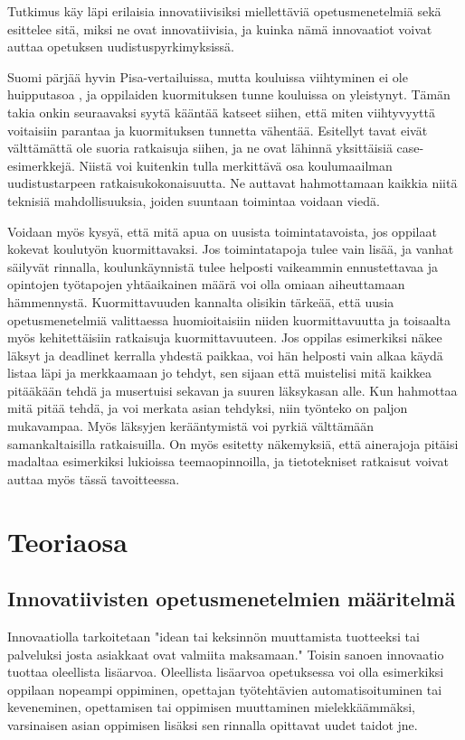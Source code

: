\documentclass[utf8,bachelor]{gradu3}
\begin{document}
Tutkimus käy läpi erilaisia innovatiivisiksi miellettäviä opetusmenetelmiä sekä esittelee sitä, miksi ne ovat innovatiivisia, ja kuinka nämä innovaatiot voivat auttaa opetuksen uudistuspyrkimyksissä. %

Suomi pärjää hyvin Pisa-vertailuissa, mutta kouluissa viihtyminen ei ole huipputasoa \parencite[][]{kouluViihtyvyys}, ja oppilaiden kuormituksen tunne kouluissa on yleistynyt. \parencite [][]{oppilaidenKuormitus} Tämän takia onkin seuraavaksi syytä kääntää katseet siihen, että miten viihtyvyyttä voitaisiin parantaa ja kuormituksen tunnetta vähentää. Esitellyt tavat eivät välttämättä ole suoria ratkaisuja siihen, ja ne ovat lähinnä yksittäisiä case-esimerkkejä. Niistä voi kuitenkin tulla merkittävä osa koulumaailman uudistustarpeen ratkaisukokonaisuutta. Ne auttavat hahmottamaan kaikkia niitä teknisiä mahdollisuuksia, joiden suuntaan toimintaa voidaan viedä. 

Voidaan myös kysyä, että mitä apua on uusista toimintatavoista, jos oppilaat kokevat koulutyön kuormittavaksi. Jos toimintatapoja tulee vain lisää, ja vanhat säilyvät rinnalla, koulunkäynnistä tulee helposti vaikeammin ennustettavaa ja opintojen työtapojen yhtäaikainen määrä voi olla omiaan aiheuttamaan hämmennystä. Kuormittavuuden kannalta olisikin tärkeää, että uusia opetusmenetelmiä valittaessa huomioitaisiin niiden kuormittavuutta ja toisaalta myös kehitettäisiin ratkaisuja kuormittavuuteen. Jos oppilas esimerkiksi näkee läksyt ja deadlinet kerralla yhdestä paikkaa, voi hän helposti vain alkaa käydä listaa läpi ja merkkaamaan jo tehdyt, sen sijaan että muistelisi mitä kaikkea pitääkään tehdä ja musertuisi sekavan ja suuren läksykasan alle. Kun hahmottaa mitä pitää tehdä, ja voi merkata asian tehdyksi, niin työnteko on paljon mukavampaa. Myös läksyjen kerääntymistä voi pyrkiä välttämään samankaltaisilla ratkaisuilla. On myös esitetty näkemyksiä, että ainerajoja pitäisi madaltaa esimerkiksi lukioissa teemaopinnoilla, ja tietotekniset ratkaisut voivat auttaa myös tässä tavoitteessa. %

\chapter{Teoriaosa}
\section{Innovatiivisten opetusmenetelmien määritelmä}
Innovaatiolla tarkoitetaan "idean tai keksinnön muuttamista tuotteeksi tai palveluksi josta asiakkaat ovat valmiita maksamaan." \parencite[][]{innovaatio} Toisin sanoen innovaatio tuottaa oleellista lisäarvoa. Oleellista lisäarvoa opetuksessa voi olla esimerkiksi oppilaan nopeampi oppiminen, opettajan työtehtävien automatisoituminen tai keveneminen, opettamisen tai oppimisen muuttaminen mielekkäämmäksi, varsinaisen asian oppimisen lisäksi sen rinnalla opittavat uudet taidot jne.
\end{document}
